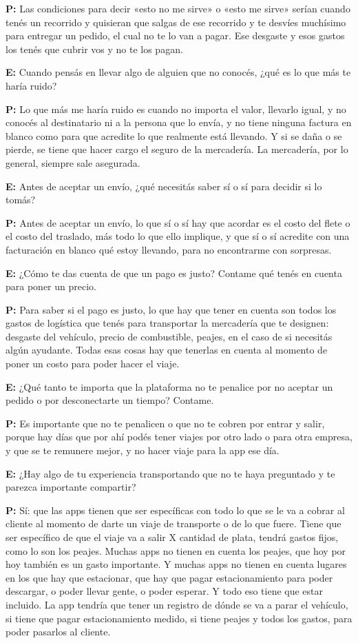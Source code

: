 {\noindent\textbf{P:} Las condiciones para decir «esto no me sirve» o «esto me sirve» serían cuando tenés un recorrido y quisieran que salgas de ese recorrido y te desvíes muchísimo para entregar un pedido, el cual no te lo van a pagar. Ese desgaste y esos gastos los tenés que cubrir vos y no te los pagan.

\noindent\textbf{E:} Cuando pensás en llevar algo de alguien que no conocés, ¿qué es lo que más te haría ruido?

\noindent\textbf{P:} Lo que más me haría ruido es cuando no importa el valor, llevarlo igual, y no conocés al destinatario ni a la persona que lo envía, y no tiene ninguna factura en blanco como para que acredite lo que realmente está llevando. Y si se daña o se pierde, se tiene que hacer cargo el seguro de la mercadería. La mercadería, por lo general, siempre sale asegurada.

\noindent\textbf{E:} Antes de aceptar un envío, ¿qué necesitás saber sí o sí para decidir si lo tomás?

\noindent\textbf{P:} Antes de aceptar un envío, lo que sí o sí hay que acordar es el costo del flete o el costo del traslado, más todo lo que ello implique, y que sí o sí acredite con una facturación en blanco qué estoy llevando, para no encontrarme con sorpresas.

\noindent\textbf{E:} ¿Cómo te das cuenta de que un pago es justo? Contame qué tenés en cuenta para poner un precio.

\noindent\textbf{P:} Para saber si el pago es justo, lo que hay que tener en cuenta son todos los gastos de logística que tenés para transportar la mercadería que te designen: desgaste del vehículo, precio de combustible, peajes, en el caso de si necesitás algún ayudante. Todas esas cosas hay que tenerlas en cuenta al momento de poner un costo para poder hacer el viaje.

\noindent\textbf{E:} ¿Qué tanto te importa que la plataforma no te penalice por no aceptar un pedido o por desconectarte un tiempo? Contame.

\noindent\textbf{P:} Es importante que no te penalicen o que no te cobren por entrar y salir, porque hay días que por ahí podés tener viajes por otro lado o para otra empresa, y que se te remunere mejor, y no hacer viaje para la app ese día.

\noindent\textbf{E:} ¿Hay algo de tu experiencia transportando que no te haya preguntado y te parezca importante compartir?

\noindent\textbf{P:} Sí: que las apps tienen que ser específicas con todo lo que se le va a cobrar al cliente al momento de darte un viaje de transporte o de lo que fuere. Tiene que ser específico de que el viaje va a salir X cantidad de plata, tendrá gastos fijos, como lo son los peajes. Muchas apps no tienen en cuenta los peajes, que hoy por hoy también es un gasto importante. Y muchas apps no tienen en cuenta lugares en los que hay que estacionar, que hay que pagar estacionamiento para poder descargar, o poder llevar gente, o poder esperar. Y todo eso tiene que estar incluido. La app tendría que tener un registro de dónde se va a parar el vehículo, si tiene que pagar estacionamiento medido, si tiene peajes y todos los gastos, para poder pasarlos al cliente.

}
